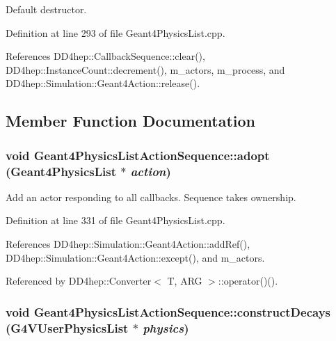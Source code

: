 Default destructor. 

Definition at line 293 of file Geant4PhysicsList.cpp.

References DD4hep::CallbackSequence::clear(), DD4hep::InstanceCount::decrement(), m\_\-actors, m\_\-process, and DD4hep::Simulation::Geant4Action::release().

\subsection{Member Function Documentation}
\hypertarget{class_d_d4hep_1_1_simulation_1_1_geant4_physics_list_action_sequence_a142dc8e16755a619d103c295b7e6445b}{
\subsubsection[{adopt}]{\setlength{\rightskip}{0pt plus 5cm}void Geant4PhysicsListActionSequence::adopt ({\bf Geant4PhysicsList} $\ast$ {\em action})}}
\label{class_d_d4hep_1_1_simulation_1_1_geant4_physics_list_action_sequence_a142dc8e16755a619d103c295b7e6445b}


Add an actor responding to all callbacks. Sequence takes ownership. 

Definition at line 331 of file Geant4PhysicsList.cpp.

References DD4hep::Simulation::Geant4Action::addRef(), DD4hep::Simulation::Geant4Action::except(), and m\_\-actors.

Referenced by DD4hep::Converter$<$ T, ARG $>$::operator()().\hypertarget{class_d_d4hep_1_1_simulation_1_1_geant4_physics_list_action_sequence_ad87f044fc81f3ac371ad5396dcb21d53}{
\subsubsection[{constructDecays}]{\setlength{\rightskip}{0pt plus 5cm}void Geant4PhysicsListActionSequence::constructDecays (G4VUserPhysicsList $\ast$ {\em physics})}}
\label{class_d_d4hep_1_1_simulation_1_1_geant4_physics_list_action_sequence_ad87f044fc81f3ac371ad5396dcb21d53}


